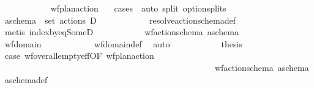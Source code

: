 \begin{isabellebody}
\ \ \ \ \ \ \ \ \ \ \isamarkupfalse%
\ {\isacartoucheopen}wf{\isacharunderscore}{\kern0pt}plan{\isacharunderscore}{\kern0pt}action\ {\isasympi}{\isacartoucheclose}\ \isamarkupfalse%
\ {\isacharparenleft}{\kern0pt}cases\ {\isasympi}{\isacharparenright}{\kern0pt}\ {\isacharparenleft}{\kern0pt}auto\ split{\isacharcolon}{\kern0pt}\ option{\isachardot}{\kern0pt}splits{\isacharparenright}{\kern0pt}\isanewline
\ \ \ \ \ \ \ \ \isamarkupfalse%
\ \isamarkupfalse%
\ {\isachardoublequoteopen}a\isactrlsub s\isactrlsub c\isactrlsub h\isactrlsub e\isactrlsub m\isactrlsub a\ {\isasymin}\ set\ {\isacharparenleft}{\kern0pt}actions\ D{\isacharparenright}{\kern0pt}{\isachardoublequoteclose}\isanewline
\ \ \ \ \ \ \ \ \ \ \isamarkupfalse%
\ resolve{\isacharunderscore}{\kern0pt}action{\isacharunderscore}{\kern0pt}schema{\isacharunderscore}{\kern0pt}def\ \isamarkupfalse%
\ {\isacharparenleft}{\kern0pt}metis\ index{\isacharunderscore}{\kern0pt}by{\isacharunderscore}{\kern0pt}eq{\isacharunderscore}{\kern0pt}SomeD{\isacharparenright}{\kern0pt}\isanewline
\ \ \ \ \ \ \ \ \isamarkupfalse%
\ \isamarkupfalse%
\ {\isachardoublequoteopen}wf{\isacharunderscore}{\kern0pt}action{\isacharunderscore}{\kern0pt}schema\ a\isactrlsub s\isactrlsub c\isactrlsub h\isactrlsub e\isactrlsub m\isactrlsub a{\isachardoublequoteclose}\isanewline
\ \ \ \ \ \ \ \ \ \ \isamarkupfalse%
\ wf{\isacharunderscore}{\kern0pt}domain\isanewline
\ \ \ \ \ \ \ \ \ \ \isamarkupfalse%
\ wf{\isacharunderscore}{\kern0pt}domain{\isacharunderscore}{\kern0pt}def\ \isamarkupfalse%
\ auto\isanewline
\ \ \ \ \ \ \ \ \isamarkupfalse%
\ \isamarkupfalse%
\ {\isacharquery}{\kern0pt}thesis\isanewline
\ \ \ \ \ \ \ \ \ \ \isamarkupfalse%
\ {\isacartoucheopen}{\isacharquery}{\kern0pt}case{}{\isacartoucheclose}\ wf{\isacharunderscore}{\kern0pt}over{\isacharunderscore}{\kern0pt}all{\isacharunderscore}{\kern0pt}empty{\isacharunderscore}{\kern0pt}eff{\isacharbrackleft}{\kern0pt}OF\ {\isacartoucheopen}wf{\isacharunderscore}{\kern0pt}plan{\isacharunderscore}{\kern0pt}action\ {\isasympi}{\isacartoucheclose}\ \isanewline
\ \ \ \ \ \ \ \ \ \ \ \ \ \ \ \ \ \ \ \ \ \ \ \ \ \ \ \ \ \ \ \ \ \ \ \ \ \ \ \ \ \ \ \ \ \ \ \ \ \ {\isacartoucheopen}wf{\isacharunderscore}{\kern0pt}action{\isacharunderscore}{\kern0pt}schema\ a\isactrlsub s\isactrlsub c\isactrlsub h\isactrlsub e\isactrlsub m\isactrlsub a{\isacartoucheclose}\ a\isactrlsub s\isactrlsub c\isactrlsub h\isactrlsub e\isactrlsub m\isactrlsub a{\isacharunderscore}{\kern0pt}def{\isacharbrackright}{\kern0pt}\isanewline

\end{isabellebody}
